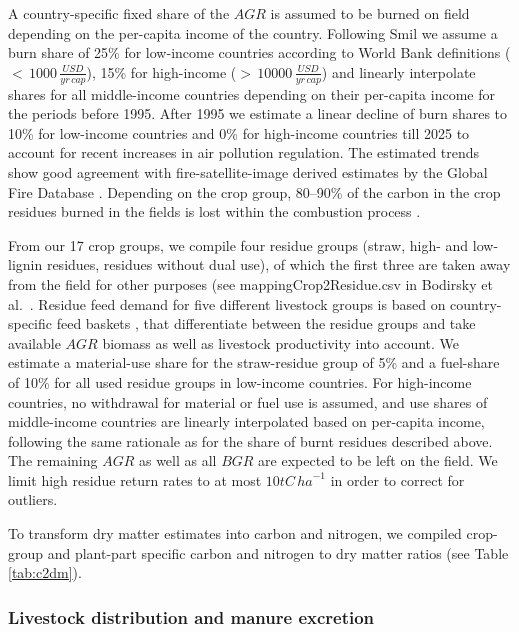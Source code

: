 \documentclass[gc, manuscript]{copernicus}
\begin{document}
A country-specific fixed share of the \(AGR\) is assumed to be burned on field depending on the per-capita income of the country. Following Smil \citeyearpar{smil_nitrogen_1999} we assume a burn share of 25\% for low-income countries according to World Bank definitions (\(<\,1000\,\tfrac{USD}{yr\,cap}\)), 15\% for high-income (\(>\,10000\,\tfrac{USD}{yr\,cap}\)) and linearly interpolate shares for all middle-income countries depending on their per-capita income for the periods before 1995. After 1995 we estimate a linear decline of burn shares to 10\% for low-income countries and 0\% for high-income countries till 2025 to account for recent increases in air pollution regulation. The estimated trends show good agreement with fire-satellite-image derived estimates by the Global Fire Database \citep{vanderWerf_fire_2017}. Depending on the crop group, 80--90\% of the carbon in the crop residues burned in the fields is lost within the combustion process \citep{eggleston_ipcc_2006}.

From our 17 crop groups, we compile four residue groups (straw, high- and low-lignin residues, residues without dual use), of which the first three are taken away from the field for other purposes (see mappingCrop2Residue.csv in Bodirsky et al.~\citeyearpar{bodirsky_mrcommons_2020}. Residue feed demand for five different livestock groups is based on country-specific feed baskets \citep[see][]{weindl_livestock_2017}, that differentiate between the residue groups and take available \(AGR\) biomass as well as livestock productivity into account. We estimate a material-use share for the straw-residue group of 5\% and a fuel-share of 10\% for all used residue groups in low-income countries. For high-income countries, no withdrawal for material or fuel use is assumed, and use shares of middle-income countries are linearly interpolated based on per-capita income, following the same rationale as for the share of burnt residues described above. The remaining \(AGR\) as well as all \(BGR\) are expected to be left on the field. We limit high residue return rates to at most \(10\unit{tC\,ha}^{-1}\) in order to correct for outliers.

To transform dry matter estimates into carbon and nitrogen, we compiled crop-group and plant-part specific carbon and nitrogen to dry matter ratios (see Table \ref{tab:c2dm}).

\hypertarget{sec:livstmanure}{%
\subsubsection{Livestock distribution and manure excretion}\label{sec:livstmanure}}
\end{document}
